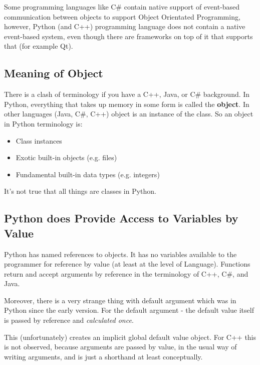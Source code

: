 \documentclass[
]{article}
\begin{document}
Some programming languages like C\# contain native support of
event-based communication between objects to support Object Orientated
Programming, however, Python (and C++) programming language does not
contain a native event-based system, even though there are frameworks on
top of it that supports that (for example Qt).

\hypertarget{meaning-of-object}{%
\subsection{Meaning of Object}\label{meaning-of-object}}

There is a clash of terminology if you have a C++, Java, or C\#
background. In Python, everything that takes up memory in some form is
called the \textbf{object}. In other languages (Java, C\#, C++) object
is an instance of the class. So an object in Python terminology is:

\begin{itemize}
\item
  Class instances
\item
  Exotic built-in objects (e.g. files)
\item
  Fundamental built-in data types (e.g. integers)
\end{itemize}

It's not true that all things are classes in Python.

\hypertarget{python-does-provide-access-to-variables-by-value}{%
\subsection{Python does Provide Access to Variables by
Value}\label{python-does-provide-access-to-variables-by-value}}

Python has named references to objects. It has no variables available to
the programmer for reference by value (at least at the level of
Language). Functions return and accept arguments by reference in the
terminology of C++, C\#, and Java.

Moreover, there is a very strange thing with default argument which was
in Python since the early version. For the default argument - the
default value itself is passed by reference and \emph{calculated once}.

This (unfortunately) creates an implicit global default value object.
For C++ this is not observed, because arguments are passed by value, in
the usual way of writing arguments, and is just a shorthand at least
conceptually.
\end{document}
